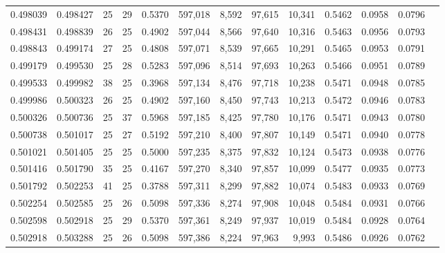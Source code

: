 \begin{tabular}{rrrrrrrrrrrrr}
0.498039 & 0.498427 &    25 &  29 &                                     0.5370 & 597,018 &   8,592 &  97,615 &  10,341 & 0.5462 & 0.0958 & 0.0796 \\
0.498431 & 0.498839 &    26 &  25 &                                     0.4902 & 597,044 &   8,566 &  97,640 &  10,316 & 0.5463 & 0.0956 & 0.0793 \\
0.498843 & 0.499174 &    27 &  25 &                                     0.4808 & 597,071 &   8,539 &  97,665 &  10,291 & 0.5465 & 0.0953 & 0.0791 \\
0.499179 & 0.499530 &    25 &  28 &                                     0.5283 & 597,096 &   8,514 &  97,693 &  10,263 & 0.5466 & 0.0951 & 0.0789 \\
0.499533 & 0.499982 &    38 &  25 &                                     0.3968 & 597,134 &   8,476 &  97,718 &  10,238 & 0.5471 & 0.0948 & 0.0785 \\
0.499986 & 0.500323 &    26 &  25 &                                     0.4902 & 597,160 &   8,450 &  97,743 &  10,213 & 0.5472 & 0.0946 & 0.0783 \\
0.500326 & 0.500736 &    25 &  37 &                                     0.5968 & 597,185 &   8,425 &  97,780 &  10,176 & 0.5471 & 0.0943 & 0.0780 \\
0.500738 & 0.501017 &    25 &  27 &                                     0.5192 & 597,210 &   8,400 &  97,807 &  10,149 & 0.5471 & 0.0940 & 0.0778 \\
0.501021 & 0.501405 &    25 &  25 &                                     0.5000 & 597,235 &   8,375 &  97,832 &  10,124 & 0.5473 & 0.0938 & 0.0776 \\
0.501416 & 0.501790 &    35 &  25 &                                     0.4167 & 597,270 &   8,340 &  97,857 &  10,099 & 0.5477 & 0.0935 & 0.0773 \\
0.501792 & 0.502253 &    41 &  25 &                                     0.3788 & 597,311 &   8,299 &  97,882 &  10,074 & 0.5483 & 0.0933 & 0.0769 \\
0.502254 & 0.502585 &    25 &  26 &                                     0.5098 & 597,336 &   8,274 &  97,908 &  10,048 & 0.5484 & 0.0931 & 0.0766 \\
0.502598 & 0.502918 &    25 &  29 &                                     0.5370 & 597,361 &   8,249 &  97,937 &  10,019 & 0.5484 & 0.0928 & 0.0764 \\
0.502918 & 0.503288 &    25 &  26 &                                     0.5098 & 597,386 &   8,224 &  97,963 &   9,993 & 0.5486 & 0.0926 & 0.0762 \\

\end{tabular}
